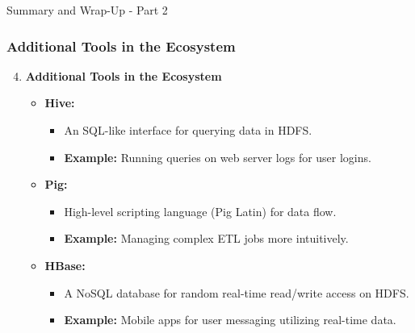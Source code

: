 \documentclass[aspectratio=169]{beamer}
\begin{document}
\begin{frame}[fragile]{Summary and Wrap-Up - Part 2}
    \frametitle{Additional Tools in the Ecosystem}
    
    \begin{enumerate}
        \setcounter{enumi}{3}  %
        
        \item \textbf{Additional Tools in the Ecosystem}
            \begin{itemize}
                \item \textbf{Hive:} 
                \begin{itemize}
                    \item An SQL-like interface for querying data in HDFS.
                    \item \textbf{Example:} Running queries on web server logs for user logins.
                \end{itemize}
                
                \item \textbf{Pig:} 
                \begin{itemize}
                    \item High-level scripting language (Pig Latin) for data flow.
                    \item \textbf{Example:} Managing complex ETL jobs more intuitively. 
                \end{itemize}
                
                \item \textbf{HBase:} 
                \begin{itemize}
                    \item A NoSQL database for random real-time read/write access on HDFS.
                    \item \textbf{Example:} Mobile apps for user messaging utilizing real-time data.
                \end{itemize}
            \end{itemize}
    \end{enumerate}
\end{frame}
\end{document}
